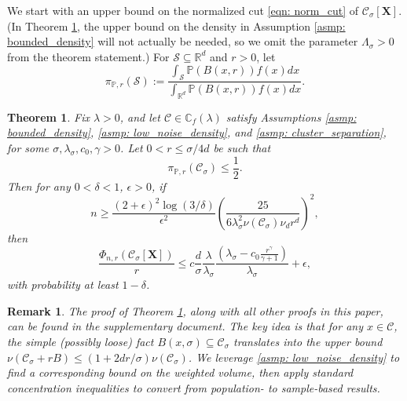 \documentclass{article}
\newcommand{\Reals}{\mathbb{R}}
\newcommand{\Rd}{\Reals^d}
\newcommand{\1}{\mathbf{1}}
\newcommand{\Xbf}{\mathbf{X}}
\newcommand{\Pbb}{\mathbb{P}}
\newcommand{\Cbb}{\mathbb{C}}
\newcommand{\Cset}{\mathcal{C}}
\newcommand{\Csig}{\Cset_{\sigma}}
\theoremstyle{aldenthm}
\newtheorem{theorem}{Theorem}
\theoremstyle{aldenrmrk}
\newtheorem{remark}{Remark}
\begin{document}
We start with an upper bound on the normalized cut \eqref{eqn: norm_cut} of 
$\Cset_\sigma[\Xbf]$. (In Theorem \ref{thm: conductance_upper_bound}, the upper bound on the density in
Assumption \ref{asmp: bounded_density} will not actually be needed, so we omit
the parameter $\Lambda_\sigma>0$ from the theorem statement.) For $\mathcal{S} \subseteq \Reals^d$ and $r > 0$, let
\begin{equation*}
\pi_{\Pbb,r}(\mathcal{S}) := \frac{\int_{\mathcal{S}} \Pbb(B(x,r)) f(x) dx }{\int_{\Rd} \Pbb(B(x,r)) f(x) dx}.
\end{equation*}

\begin{theorem}
\label{thm: conductance_upper_bound}
Fix $\lambda > 0$, and let $\Cset \in \Cbb_f(\lambda)$ satisfy
Assumptions \ref{asmp: bounded_density}, \ref{asmp: low_noise_density},
and \ref{asmp: cluster_separation}, for some 
$\sigma, \lambda_{\sigma}, c_0, \gamma > 0$. Let $0 < r \leq \sigma/4d$ be such that
\begin{equation}
\label{eqn: weighted_cluster_volume}
\pi_{\Pbb,r}(\Csig) \leq \frac{1}{2}.
\end{equation}
 Then for any $0 < \delta < 1$, $\epsilon > 0$, if
\begin{equation}
\label{eqn: conductance_sample_complexity}
n \geq \frac{(2+\epsilon)^2\log(3/\delta)}{\epsilon^2}\left(\frac{25}
  {6 \lambda_{\sigma}^2\nu(\Csig) \nu_d r^d}\right)^2,
\end{equation}
then
\begin{equation}
  \label{eqn: conductance_additive_error_bound}
  \frac{\Phi_{n,r}(\Csig[\mathbf{X}])}{r} \leq c \frac{d}{\sigma}
  \frac{\lambda}{\lambda_{\sigma}} \frac{(\lambda_{\sigma} -
    c_0\frac{r^{\gamma}}{\gamma+1})}{\lambda_{\sigma}} + \epsilon, 
\end{equation}
with probability at least $1-\delta$.
\end{theorem}

\begin{remark}
The proof of Theorem \ref{thm: conductance_upper_bound}, along with all other
proofs in this paper, can be found in the supplementary document. The key 
idea is that for any $x \in \Cset$, the simple (possibly loose) fact
$B(x,\sigma) \subseteq \Csig$ translates into the upper bound $\nu(\Csig + rB) \leq (1 + 2d r /\sigma)\nu(\Csig)$. We leverage \ref{asmp:
  low_noise_density} to find a corresponding bound on the weighted volume,
then apply standard concentration inequalities to convert from population-
to sample-based results.  
\end{remark}
\end{document}
